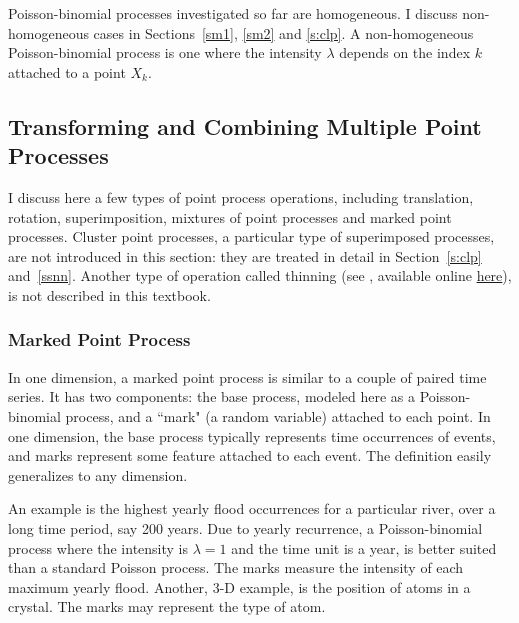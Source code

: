 \documentclass[10pt]{article}
\begin{document}
Poisson-binomial processes investigated so far are homogeneous. I discuss non-homogeneous cases in Sections~\ref{sm1}, \ref{sm2} and \ref{s:clp}. A non-homogeneous Poisson-binomial process is one where the intensity $\lambda$ depends on the index $k$ attached to a point $X_k$.

\subsection{Transforming and Combining Multiple Point Processes}\label{trtr}

I discuss here a few types of \textcolor{index}{point process operations}, including translation, rotation, superimposition, mixtures of point processes and marked point processes. Cluster point processes, a particular type of superimposed processes, are not introduced in this section: they are treated in detail in Section~\ref{s:clp} 
and~\ref{ssnn}. Another type of operation called \textcolor{index}{thinning} (see \cite{thinned}, available online \href{http://www.stat.ucla.edu/~frederic/papers/thinning8b.pdf}{here}), is not described in this textbook.

\subsubsection{Marked Point Process}\label{mpp}

In one dimension, a \textcolor{index}{marked point process}  is similar to a couple of paired time series. It has two components: the base process, modeled here as a Poisson-binomial process, and a ``mark" (a random variable) attached to each point. In one dimension, the base process typically represents time occurrences of events, and marks represent some feature attached to each event. The definition easily generalizes to any dimension.

An example is the highest yearly flood occurrences for a particular river, over a long time period, say 200 years. Due to yearly recurrence,  a Poisson-binomial process where the intensity is $\lambda=1$ and the time unit is a year, is better suited than a standard Poisson process. The marks measure the intensity of each maximum yearly flood. Another, 3-D example, is the position of atoms in a crystal. The marks may represent the type of atom. 
\end{document}
